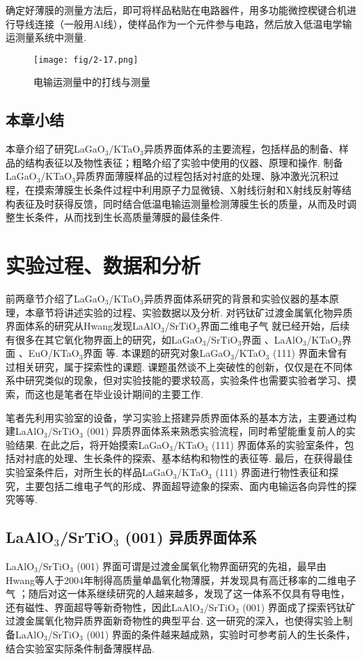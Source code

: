 \documentclass[12pt,a4paper,openany,twoside,UTF-8]{book}
\begin{document}
确定好薄膜的测量方法后，即可将样品粘贴在电路器件，用多功能微控楔键合机进行导线连接（一般用Al线），使样品作为一个元件参与电路，然后放入低温电学输运测量系统中测量.

\begin{figure}[htbp]
\centering
\texttt{[image: fig/2-17.png]}
\caption{电输运测量中的打线与测量}
\label{fig:2-17} 
\end{figure}

\section{本章小结}
本章介绍了研究LaGaO$_3$/KTaO$_3$异质界面体系的主要流程，包括样品的制备、样品的结构表征以及物性表征；粗略介绍了实验中使用的仪器、原理和操作. 制备LaGaO$_3$/KTaO$_3$异质界面薄膜样品的过程包括对衬底的处理、脉冲激光沉积过程，在摸索薄膜生长条件过程中利用原子力显微镜、X射线衍射和X射线反射等结构表征及时获得反馈，同时结合低温电输运测量检测薄膜生长的质量，从而及时调整生长条件，从而找到生长高质量薄膜的最佳条件. 



\chapter{实验过程、数据和分析}
前两章节介绍了LaGaO$_3$/KTaO$_3$异质界面体系研究的背景和实验仪器的基本原理，本章节将讲述实验的过程、实验数据以及分析. 对钙钛矿过渡金属氧化物异质界面体系的研究从Hwang发现LaAlO$_3$/SrTiO$_3$界面二维电子气 \cite{ref7}就已经开始，后续有很多在其它氧化物界面上的研究，如LaGaO$_3$/SrTiO$_3$界面 \cite{ref36}、LaAlO$_3$/KTaO$_3$界面 \cite{ref21, ref45}、EuO/KTaO$_3$界面 \cite{ref22}等. 本课题的研究对象LaGaO$_3$/KTaO$_3$ (111) 界面未曾有过相关研究，属于探索性的课题. 课题虽然谈不上突破性的创新，仅仅是在不同体系中研究类似的现象，但对实验技能的要求较高，实验条件也需要实验者学习、摸索，而这也是笔者在毕业设计期间的主要工作. 

笔者先利用实验室的设备，学习实验上搭建异质界面体系的基本方法，主要通过构建LaAlO$_3$/SrTiO$_3$ (001) 异质界面体系来熟悉实验流程，同时希望能重复前人的实验结果. 在此之后，将开始摸索LaGaO$_3$/KTaO$_3$ (111) 界面体系的实验室条件，包括对衬底的处理、生长条件的探索、基本结构和物性的表征等. 最后，在获得最佳实验室条件后，对所生长的样品LaGaO$_3$/KTaO$_3$ (111) 界面进行物性表征和探究，主要包括二维电子气的形成、界面超导迹象的探索、面内电输运各向异性的探究等等.

\section{LaAlO$_3$/SrTiO$_3$ (001) 异质界面体系}
LaAlO$_3$/SrTiO$_3$ (001) 界面可谓是过渡金属氧化物界面研究的先祖，最早由 Hwang等人于2004年制得高质量单晶氧化物薄膜，并发现具有高迁移率的二维电子气 \cite{ref7}；随后对这一体系继续研究的人越来越多，发现了这一体系不仅具有导电性，还有磁性\cite{ref37}、界面超导\cite{ref15}等新奇物性，因此LaAlO$_3$/SrTiO$_3$ (001) 界面成了探索钙钛矿过渡金属氧化物异质界面新奇物性的典型平台. 这一研究的深入，也使得实验上制备LaAlO$_3$/SrTiO$_3$ (001) 界面的条件越来越成熟，实验时可参考前人的生长条件，结合实验室实际条件制备薄膜样品.
\end{document}
